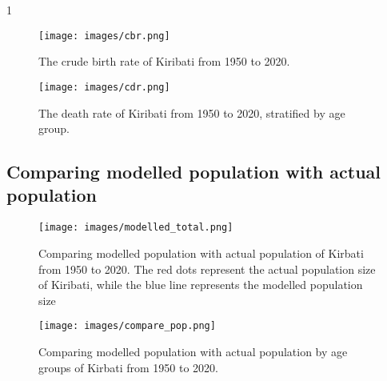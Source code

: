 1
\begin{figure}[!htp]
   \texttt{[image: images/cbr.png]}
    \caption{The crude birth rate of Kiribati from 1950 to 2020.}
    \label{fig:cbr}
\end{figure}

\begin{figure}[!htp]
   \centerline{\texttt{[image: images/cdr.png]}}
    \caption{The death rate of Kiribati from 1950 to 2020, stratified by age group.}
    \label{fig:cdr}
\end{figure}

\subsection{Comparing modelled population with actual population}
\begin{figure}[!htp]
    \centerline{\texttt{[image: images/modelled\_total.png]}}
    \caption{Comparing modelled population with actual population of Kirbati from 1950 to 2020. The red dots represent the actual population size of Kiribati,
     while the blue line represents the modelled population size}
    \label{fig:modelled_total}
\end{figure}

\begin{figure}[!htp]
    \centerline{\texttt{[image: images/compare\_pop.png]}}
    \caption{Comparing modelled population with actual population by age groups of Kirbati from 1950 to 2020.}
    \label{fig:compare_group}
\end{figure}